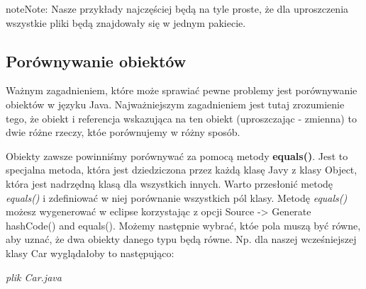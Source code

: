 \documentclass[letterpaper,10pt,english]{sphinxmanual}
\begin{document}
\begin{notice}{note}{Note:}
Nasze przykłady najczęściej będą na tyle proste, że dla uproszczenia wszystkie pliki będą znajdowały się w jednym pakiecie.
\end{notice}


\subsection{Porównywanie obiektów}
\label{obiekty:porownywanie-obiektow}
Ważnym zagadnieniem, które może sprawiać pewne problemy jest porównywanie obiektów w języku Java. Najważniejszym zagadnieniem jest tutaj zrozumienie tego, że obiekt i referencja wskazująca na ten obiekt (uproszczając - zmienna) to dwie różne rzeczy, któe porównujemy w różny sposób.

Obiekty zawsze powinniśmy porównywać za pomocą metody \textbf{equals()}. Jest to specjalna metoda, która jest dziedziczona przez każdą klasę Javy z klasy Object, która jest nadrzędną klasą dla wszystkich innych. Warto przesłonić metodę \emph{equals()} i zdefiniować w niej porównanie wszystkich pól klasy. Metodę \emph{equals()} możesz wygenerować w eclipse korzystając z opcji Source -\textgreater{} Generate hashCode() and equals(). Możemy następnie wybrać, któe pola muszą być równe, aby uznać, że dwa obiekty danego typu będą równe. Np. dla naszej wcześniejszej klasy Car wyglądałoby to następująco:

\emph{plik Car.java}
\end{document}
